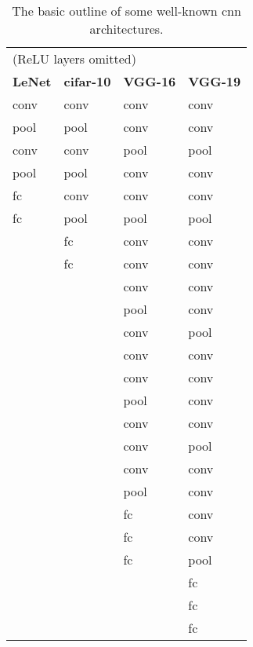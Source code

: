 \begin{table}[]
\centering
\caption[Some well-known cnn architectures]{The basic outline of some well-known cnn architectures.}
\label{tbl:cnns}
\begin{tabular}{llll}
\multicolumn{4}{l}{(ReLU layers omitted)}                              \\
\textbf{LeNet} & \textbf{cifar-10} & \textbf{VGG-16} & \textbf{VGG-19} \\
conv           & conv              & conv            & conv            \\
pool           & pool              & conv            & conv            \\
conv           & conv              & pool            & pool            \\
pool           & pool              & conv            & conv            \\
fc             & conv              & conv            & conv            \\
fc             & pool              & pool            & pool            \\
               & fc                & conv            & conv            \\
               & fc                & conv            & conv            \\
               &                   & conv            & conv            \\
               &                   & pool            & conv            \\
               &                   & conv            & pool            \\
               &                   & conv            & conv            \\
               &                   & conv            & conv            \\
               &                   & pool            & conv            \\
               &                   & conv            & conv            \\
               &                   & conv            & pool            \\
               &                   & conv            & conv            \\
               &                   & pool            & conv            \\
               &                   & fc              & conv            \\
               &                   & fc              & conv            \\
               &                   & fc              & pool            \\
               &                   &                 & fc              \\
               &                   &                 & fc              \\
               &                   &                 & fc             
\end{tabular}
\end{table}

